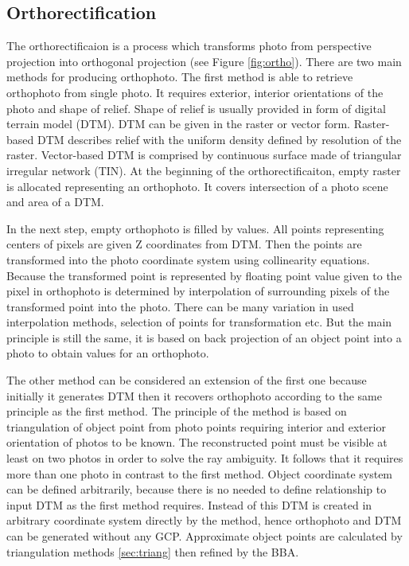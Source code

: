 \documentclass[a4paper,12pt]{article}
\begin{document}
\subsection{Orthorectification}


The orthorectificaion is a process which transforms photo from perspective projection into orthogonal projection (see Figure \ref{fig:ortho}). 
\label{sec:single_ortho}
There are two main methods for producing orthophoto. The first method is able to retrieve orthophoto 
from single photo. It requires exterior, interior orientations of the photo and shape of relief. 
Shape of relief is usually provided in form of digital terrain model (DTM). DTM 
can be given in the raster or vector form. Raster-based DTM describes relief with the uniform density defined by resolution of the raster.
Vector-based DTM is comprised by continuous surface made of triangular irregular network (TIN). 
At the beginning of the orthorectificaiton, empty raster is allocated representing an orthophoto.
It covers intersection of a photo scene and area of a DTM.

In the next step, empty orthophoto is filled by values. 
All points representing centers of pixels are given Z coordinates from DTM. 
Then the points are transformed into the photo coordinate system using collinearity equations.
Because the transformed point is represented by floating point value given 
to the pixel in orthophoto is determined by interpolation of surrounding pixels of the transformed 
point into the photo. There can be many variation in used interpolation methods, selection of points 
for transformation etc. 
But the main principle is still the same, it is based on back projection of  an object point into 
a photo to obtain values for an orthophoto.


The other method can be considered an extension of the first one because initially it generates DTM then it recovers orthophoto 
according to the same principle as the first method. The principle of the method is based on triangulation of object point
from photo points requiring interior and exterior orientation of photos to be known. The reconstructed point 
must be visible at least on two photos in order to solve the ray ambiguity. It follows that it requires more than 
one photo in contrast to the first method.
Object coordinate system 
can be defined arbitrarily, because there is no needed to define relationship to input DTM as the first method requires.
Instead of this DTM is created in arbitrary coordinate system directly by the method,
hence orthophoto and DTM can be generated without any GCP. 
Approximate object points  are calculated by triangulation 
methods \ref{sec:triang} then refined by the BBA. 
\end{document}
